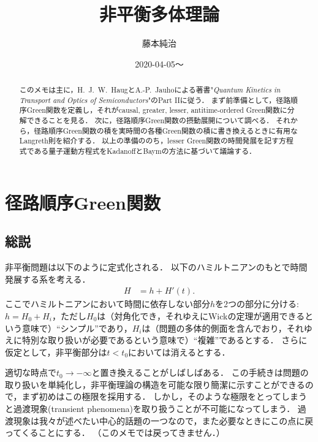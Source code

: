 \documentclass[a4paper,10pt]{jsarticle}
\title{非平衡多体理論}
\affiliation{中国科学院大学 Kavli理論科学研究所}
\author{藤本純治}
\date{2020-04-05〜}
\begin{document}
%
\maketitle

\begin{abstract}
このメモは主に，H.~J.~W.~HaugとA.-P.~Jauhoによる著書"\textit{Quantum Kinetics in Transport and Optics of Semiconductors}"のPart IIに従う．
まず前準備として，径路順序Green関数を定義し，それがcausal, greater, lesser, antitime-ordered Green関数に分解できることを見る．
次に，径路順序Green関数の摂動展開について調べる．
それから，径路順序Green関数の積を実時間の各種Green関数の積に書き換えるときに有用なLangreth則を紹介する．
以上の準備ののち，lesser Green関数の時間発展を記す方程式である量子運動方程式をKadanoffとBaymの方法に基づいて議論する．
\end{abstract}

\setcounter{section}{3}

\section{径路順序Green関数}
\subsection{\label{sec:4.1}総説}
非平衡問題は以下のように定式化される．
以下のハミルトニアンのもとで時間発展する系を考える．
\begin{align}
H
	& = h + H' (t)
.\end{align}
ここでハミルトニアンにおいて時間に依存しない部分$h$を2つの部分に分ける:$h = H_0 + H_i$，ただし$H_0$は（対角化でき，それゆえにWickの定理が適用できるという意味で）``シンプル''であり，$H_i$は（問題の多体的側面を含んでおり，それゆえに特別な取り扱いが必要であるという意味で）``複雑''であるとする．
さらに仮定として，非平衡部分は$t < t_0$においては消えるとする．

適切な時点で$t_0 \to - \infty$と置き換えることがしばしばある．
この手続きは問題の取り扱いを単純化し，非平衡理論の構造を可能な限り簡潔に示すことができるので，まず初めはこの極限を採用する．
しかし，そのような極限をとってしまうと過渡現象(transient phenomena)を取り扱うことが不可能になってしまう．
過渡現象は我々が述べたい中心的話題の一つなので，また必要なときにこの点に戻ってくることにする．
（このメモでは戻ってきません．）
\end{document}
